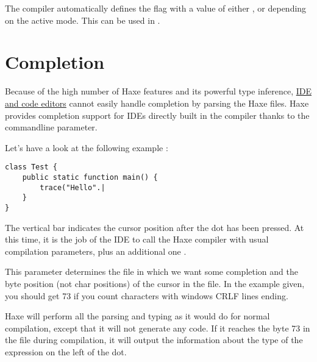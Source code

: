 The compiler automatically defines the flag  with a value of either ,  or  depending on the active mode. This can be used in .



\section{Completion}
\label{cr-completion}

Because of the high number of Haxe features and its powerful type inference, \href{http://haxe.org/documentation/introduction/editors-and-ides.html}{IDE and code editors} cannot easily handle completion by parsing the Haxe files. Haxe provides completion support for IDEs directly built in the compiler thanks to the  commandline parameter.

Let's have a look at the following example :
\begin{lstlisting}
class Test {
    public static function main() {
        trace("Hello".|
    }
}
\end{lstlisting}

The vertical bar indicates the cursor position after the dot has been pressed. At this time, it is the job of the IDE to call the Haxe compiler with usual compilation parameters, plus an additional one .

This parameter determines the file in which we want some completion and the byte position (not char positions) of the cursor in the file. In the example given, you should get 73 if you count characters with windows CRLF lines ending.


Haxe will perform all the parsing and typing as it would do for normal compilation, except that it will not generate any code. If it reaches the byte 73 in the file  during compilation, it will output the information about the type of the expression on the left of the dot.


